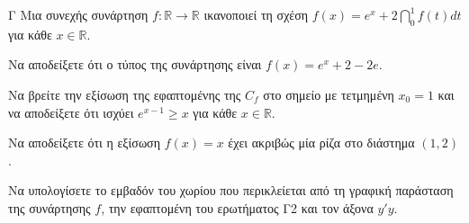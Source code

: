 \begin{thema}{Γ}
Μια συνεχής συνάρτηση $f: \mathbb{R} \to \mathbb{R}$ ικανοποιεί τη σχέση $f(x) = e^x + 2\dint_0^1 f(t)dt$ για κάθε $x \in \mathbb{R}$.
\begin{erwthma}
  \item Να αποδείξετε ότι ο τύπος της συνάρτησης είναι $f(x) = e^x + 2 - 2e$.
  \item Να βρείτε την εξίσωση της εφαπτομένης της $C_f$ στο σημείο με τετμημένη $x_0 = 1$ και να αποδείξετε ότι ισχύει $e^{x-1} \ge x$ για κάθε $x \in \mathbb{R}$.
  \item Να αποδείξετε ότι η εξίσωση $f(x) = x$ έχει ακριβώς μία ρίζα στο διάστημα $(1, 2)$.
  \item Να υπολογίσετε το εμβαδόν του χωρίου που περικλείεται από τη γραφική παράσταση της συνάρτησης $f$, την εφαπτομένη του ερωτήματος Γ2 και τον άξονα $y'y$.
\end{erwthma}
\end{thema}
